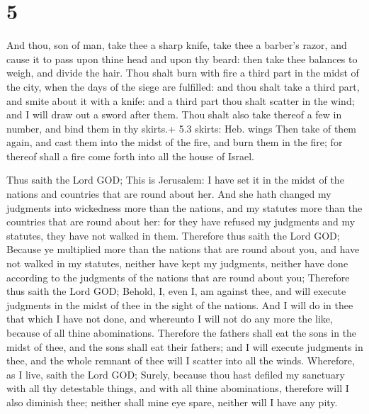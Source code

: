 \hypertarget{section-4}{%
\section{5}\label{section-4}}

 And thou, son of man, take thee a sharp knife, take thee a
barber's razor, and cause it to pass upon thine head and upon thy beard:
then take thee balances to weigh, and divide the hair.  Thou
shalt burn with fire a third part in the midst of the city, when the
days of the siege are fulfilled: and thou shalt take a third part, and
smite about it with a knife: and a third part thou shalt scatter in the
wind; and I will draw out a sword after them.  Thou shalt
also take thereof a few in number, and bind them in thy skirts.+ 5.3
skirts: Heb. wings  Then take of them again, and cast them
into the midst of the fire, and burn them in the fire; for thereof shall
a fire come forth into all the house of Israel.

 Thus saith the Lord GOD; This is Jerusalem: I have set it
in the midst of the nations and countries that are round about her.
 And she hath changed my judgments into wickedness more than
the nations, and my statutes more than the countries that are round
about her: for they have refused my judgments and my statutes, they have
not walked in them.  Therefore thus saith the Lord GOD;
Because ye multiplied more than the nations that are round about you,
and have not walked in my statutes, neither have kept my judgments,
neither have done according to the judgments of the nations that are
round about you;  Therefore thus saith the Lord GOD; Behold,
I, even I, am against thee, and will execute judgments in the midst of
thee in the sight of the nations.  And I will do in thee
that which I have not done, and whereunto I will not do any more the
like, because of all thine abominations.  Therefore the
fathers shall eat the sons in the midst of thee, and the sons shall eat
their fathers; and I will execute judgments in thee, and the whole
remnant of thee will I scatter into all the winds. 
Wherefore, as I live, saith the Lord GOD; Surely, because thou hast
defiled my sanctuary with all thy detestable things, and with all thine
abominations, therefore will I also diminish thee; neither shall mine
eye spare, neither will I have any pity.

